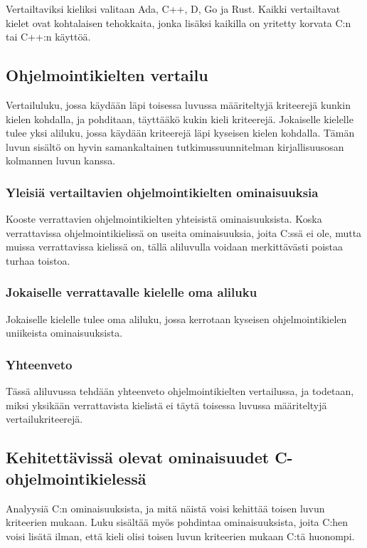 Vertailtaviksi kieliksi valitaan Ada, C++, D, Go ja Rust. Kaikki vertailtavat
kielet ovat kohtalaisen tehokkaita, jonka lisäksi kaikilla on yritetty korvata
C:n tai C++:n käyttöä.

\subsection{Ohjelmointikielten vertailu}

Vertailuluku, jossa käydään läpi toisessa luvussa määriteltyjä kriteerejä
kunkin kielen kohdalla, ja pohditaan, täyttääkö kukin kieli kriteerejä.
Jokaiselle kielelle tulee yksi aliluku, jossa käydään kriteerejä läpi kyseisen
kielen kohdalla. Tämän luvun sisältö on hyvin samankaltainen
tutkimussuunnitelman kirjallisuusosan kolmannen luvun kanssa.

\subsubsection{Yleisiä vertailtavien ohjelmointikielten ominaisuuksia}

Kooste verrattavien ohjelmointikielten yhteisistä ominaisuuksista. Koska
verrattavissa ohjelmointikielissä on useita ominaisuuksia, joita C:ssä ei ole,
mutta muissa verrattavissa kielissä on, tällä aliluvulla voidaan merkittävästi
poistaa turhaa toistoa.

\subsubsection{Jokaiselle verrattavalle kielelle oma aliluku}

Jokaiselle kielelle tulee oma aliluku, jossa kerrotaan kyseisen
ohjelmointikielen uniikeista ominaisuuksista.

\subsubsection{Yhteenveto}

Tässä aliluvussa tehdään yhteenveto ohjelmointikielten vertailussa, ja
todetaan, miksi yksikään verrattavista kielistä ei täytä toisessa luvussa
määriteltyjä vertailukriteerejä.

\subsection{Kehitettävissä olevat ominaisuudet C-ohjelmointikielessä}

Analyysiä C:n ominaisuuksista, ja mitä näistä voisi kehittää toisen luvun
kriteerien mukaan. Luku sisältää myös pohdintaa ominaisuuksista, joita C:hen
voisi lisätä ilman, että kieli olisi toisen luvun kriteerien mukaan C:tä
huonompi.


